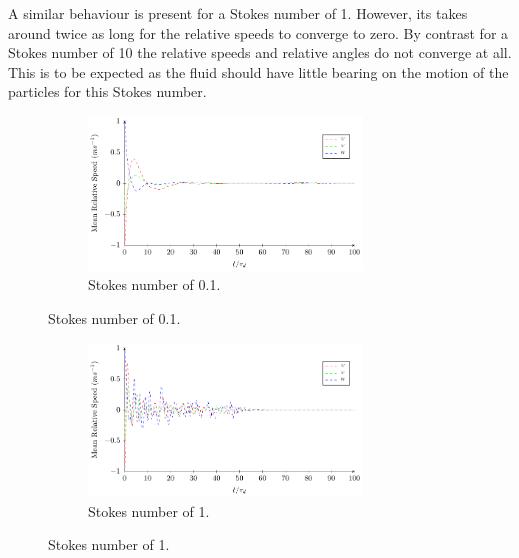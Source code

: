 \documentclass[../Interim_Report_Master]{subfiles}
\begin{document}
A similar behaviour is present for a Stokes number of 1. However, its takes around twice as long for the relative speeds to converge to zero. By contrast for a Stokes number of 10 the relative speeds and relative angles do not converge at all. This is to be expected as the fluid should have little bearing on the motion of the particles for this Stokes number.
\begin{figure}[H]
	\centering
	\begin{subfigure}[t]{\textwidth}
		\centering
		\includegraphics[width=0.8\textwidth]{./Diagrams/Statistical_Verification_Test/stk_0_1/Statistical_Verification_Test_Velocity_stk_0_1_.pdf}
		\caption{Stokes number of 0.1.}
		\label{rel_vel_stk_0_1}
	\end{subfigure}
\end{figure}
\begin{figure}\ContinuedFloat
	\centering
	\begin{subfigure}[t]{\textwidth}
		\centering
		\includegraphics[width=0.8\textwidth]{./Diagrams/Statistical_Verification_Test/stk_1/Statistical_Verification_Test_Velocity_stk_1.pdf}
		\caption{Stokes number of 1.}
		\label{rel_vel_stk_1}
	\end{subfigure}
\end{figure}
\end{document}
